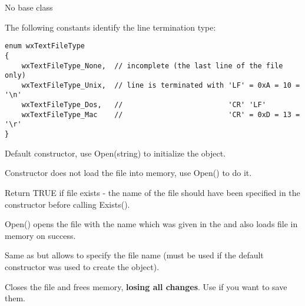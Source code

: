 


No base class


The following constants identify the line termination type:
\begin{verbatim}
enum wxTextFileType
{
    wxTextFileType_None,  // incomplete (the last line of the file only)
    wxTextFileType_Unix,  // line is terminated with 'LF' = 0xA = 10 = '\n'
    wxTextFileType_Dos,   //                         'CR' 'LF'
    wxTextFileType_Mac    //                         'CR' = 0xD = 13 = '\r'
}
\end{verbatim}


\label{wxtextfilectordef}

Default constructor, use Open(string) to initialize the object.

\label{wxtextfilector}

Constructor does not load the file into memory, use Open() to do it. 

\label{wxtextfileexists}

Return TRUE if file exists - the name of the file should have been specified
in the constructor before calling Exists().

\label{wxtextfileopen}

Open() opens the file with the name which was given in the  
and also loads file in memory on success.

\label{wxtextfileopenname}

Same as  but allows to specify the file name
(must be used if the default constructor was used to create the object).

\label{wxtextfileclose}

Closes the file and frees memory, {\bf losing all changes}. Use  
if you want to save them.

